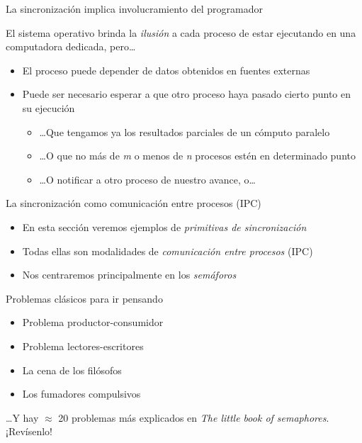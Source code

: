\documentclass[presentation]{beamer}
\begin{document}
\begin{frame}[label={sec:org5ddc493}]{La sincronización implica involucramiento del programador}
\begin{center}
El sistema operativo brinda la \emph{ilusión} a cada proceso de estar
ejecutando en una computadora dedicada, pero\ldots{}
\end{center}
\begin{itemize}
\item El proceso puede depender de datos obtenidos en fuentes externas
\item Puede ser necesario esperar a que otro proceso haya pasado cierto
punto en su ejecución
\begin{itemize}
\item …Que tengamos ya los resultados parciales de un cómputo paralelo
\item …O que no más de \emph{m} o menos de \emph{n} procesos estén en determinado punto
\item …O notificar a otro proceso de nuestro avance, o…
\end{itemize}
\end{itemize}
\end{frame}

\begin{frame}[label={sec:org5a85581}]{La sincronización como comunicación entre procesos (IPC)}
\begin{itemize}
\item En esta sección veremos ejemplos de \emph{primitivas de sincronización}
\item Todas ellas son modalidades de \emph{comunicación entre procesos} (IPC)
\item Nos centraremos principalmente en los \emph{semáforos}
\end{itemize}
\end{frame}

\begin{frame}[label={sec:org935b40e}]{Problemas clásicos para ir pensando}
\begin{itemize}
\item Problema productor-consumidor
\item Problema lectores-escritores
\item La cena de los filósofos
\item Los fumadores compulsivos
\end{itemize}

\begin{center}
…Y hay \(\approx\) 20 problemas más explicados en \emph{The little book of
semaphores}.
\vfill
¡Revísenlo!
\end{center}
\end{frame}
\end{document}
